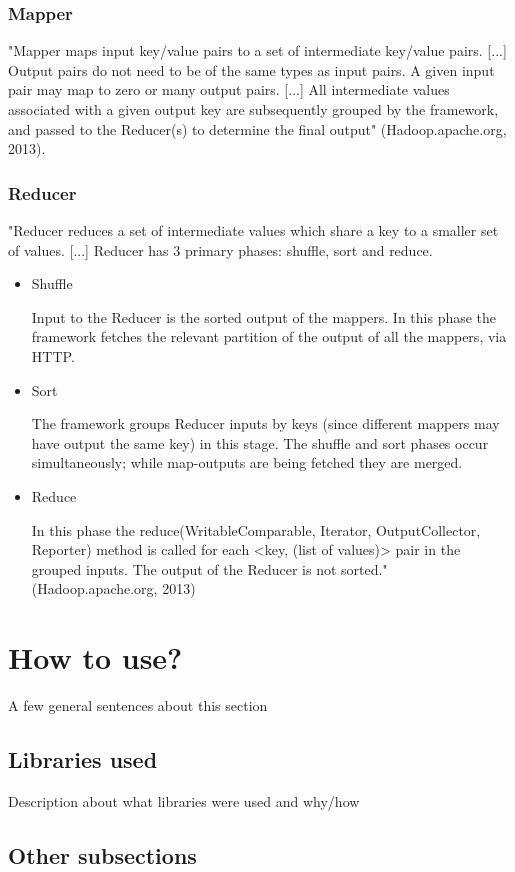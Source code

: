 \documentclass[a4paper, 12pt]{article}
\begin{document}
\subsubsection{Mapper}
"Mapper maps input key/value pairs to a set of intermediate key/value pairs. [...] Output pairs do not need to be of the same types as input pairs. A given input pair may map to zero or many output pairs. [...] All intermediate values associated with a given output key are subsequently grouped by the framework, and passed to the Reducer(s) to determine the final output" (Hadoop.apache.org, 2013). 

\subsubsection{Reducer}
"Reducer reduces a set of intermediate values which share a key to a smaller set of values. [...] Reducer has 3 primary phases: shuffle, sort and reduce. 
\begin{itemize}
	\item Shuffle

Input to the Reducer is the sorted output of the mappers. In this phase the framework fetches the relevant partition of the output of all the mappers, via HTTP.
	\item Sort

The framework groups Reducer inputs by keys (since different mappers may have output the same key) in this stage. The shuffle and sort phases occur simultaneously; while map-outputs are being fetched they are merged.
	\item Reduce

In this phase the reduce(WritableComparable, Iterator, OutputCollector, Reporter) method is called for each <key, (list of values)> pair in the grouped inputs. The output of the Reducer is not sorted." (Hadoop.apache.org, 2013)
\end{itemize}

\section{How to use?}
A few general sentences about this section

\subsection{Libraries used}
Description about what libraries were used and why/how

\subsection{Other subsections}
\end{document}
